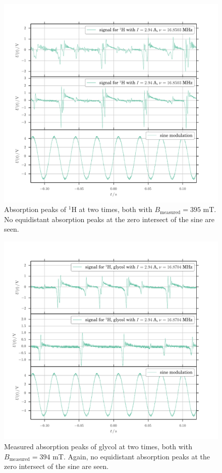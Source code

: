 \begin{figure}
	\includegraphics[width=\textwidth]{figures/f_r_H.pdf}
	\caption{
		Absorption peaks of $^1$H
		at two times, both with $B_\mathrm{measured} = 395$ mT.
		No equidistant absorption peaks at the zero intersect of the sine are seen.
		}
	\label{fig:f_r_H}
\end{figure}

\begin{figure}
	\includegraphics[width=\textwidth]{figures/f_r_glycol.pdf}
	\caption{
		Measured absorption peaks of glycol
		at two times, both with $B_\mathrm{measured} = 394$ mT.
		Again, no equidistant absorption peaks at the zero intersect of the sine are seen.
		}
	\label{fig:f_r_glycol}
\end{figure}

